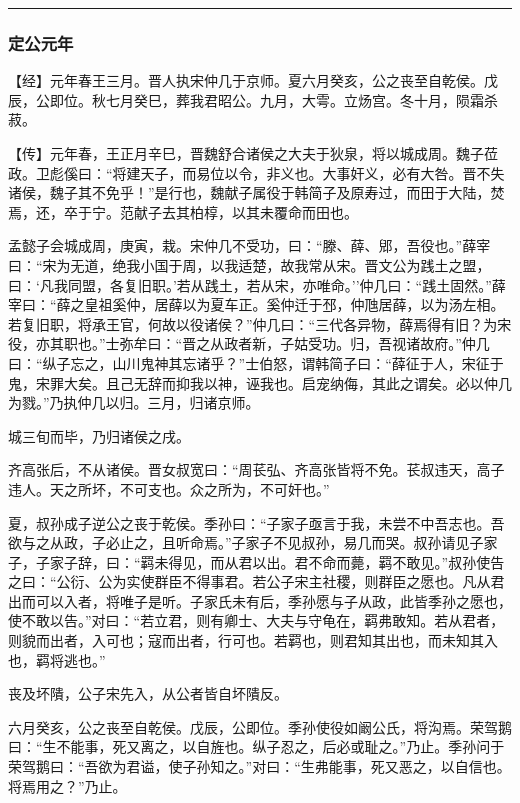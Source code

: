 \documentclass[]{article}
\begin{document}
\begin{center}\rule{0.5\linewidth}{\linethickness}\end{center}

\hypertarget{header-n2874}{%
\subsubsection{定公元年}\label{header-n2874}}

【经】元年春王三月。晋人执宋仲几于京师。夏六月癸亥，公之丧至自乾侯。戊辰，公即位。秋七月癸巳，葬我君昭公。九月，大雩。立炀宫。冬十月，陨霜杀菽。

【传】元年春，王正月辛巳，晋魏舒合诸侯之大夫于狄泉，将以城成周。魏子莅政。卫彪傒曰：``将建天子，而易位以令，非义也。大事奸义，必有大咎。晋不失诸侯，魏子其不免乎！''是行也，魏献子属役于韩简子及原寿过，而田于大陆，焚焉，还，卒于宁。范献子去其柏椁，以其未覆命而田也。

孟懿子会城成周，庚寅，栽。宋仲几不受功，曰：``滕、薛、郳，吾役也。''薛宰曰：``宋为无道，绝我小国于周，以我适楚，故我常从宋。晋文公为践土之盟，曰：`凡我同盟，各复旧职。'若从践土，若从宋，亦唯命。''仲几曰：``践土固然。''薛宰曰：``薛之皇祖奚仲，居薛以为夏车正。奚仲迁于邳，仲虺居薛，以为汤左相。若复旧职，将承王官，何故以役诸侯？''仲几曰：``三代各异物，薛焉得有旧？为宋役，亦其职也。''士弥牟曰：``晋之从政者新，子姑受功。归，吾视诸故府。''仲几曰：``纵子忘之，山川鬼神其忘诸乎？''士伯怒，谓韩简子曰：``薛征于人，宋征于鬼，宋罪大矣。且己无辞而抑我以神，诬我也。启宠纳侮，其此之谓矣。必以仲几为戮。''乃执仲几以归。三月，归诸京师。

城三旬而毕，乃归诸侯之戌。

齐高张后，不从诸侯。晋女叔宽曰：``周苌弘、齐高张皆将不免。苌叔违天，高子违人。天之所坏，不可支也。众之所为，不可奸也。''

夏，叔孙成子逆公之丧于乾侯。季孙曰：``子家子亟言于我，未尝不中吾志也。吾欲与之从政，子必止之，且听命焉。''子家子不见叔孙，易几而哭。叔孙请见子家子，子家子辞，曰：``羁未得见，而从君以出。君不命而薨，羁不敢见。''叔孙使告之曰：``公衍、公为实使群臣不得事君。若公子宋主社稷，则群臣之愿也。凡从君出而可以入者，将唯子是听。子家氏未有后，季孙愿与子从政，此皆季孙之愿也，使不敢以告。''对曰：``若立君，则有卿士、大夫与守龟在，羁弗敢知。若从君者，则貌而出者，入可也；寇而出者，行可也。若羁也，则君知其出也，而未知其入也，羁将逃也。''

丧及坏隤，公子宋先入，从公者皆自坏隤反。

六月癸亥，公之丧至自乾侯。戊辰，公即位。季孙使役如阚公氏，将沟焉。荣驾鹅曰：``生不能事，死又离之，以自旌也。纵子忍之，后必或耻之。''乃止。季孙问于荣驾鹅曰：``吾欲为君谥，使子孙知之。''对曰：``生弗能事，死又恶之，以自信也。将焉用之？''乃止。
\end{document}

